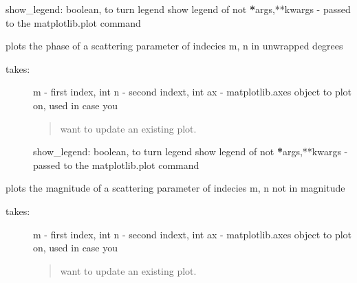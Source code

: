 \documentclass[letterpaper,10pt,english]{sphinxmanual}
\begin{document}
\begin{fulllineitems}
\begin{fulllineitems}
\begin{description}
show\_legend: boolean, to turn legend show legend of not
{\color{red}\bfseries{}*}args,**kwargs - passed to the matplotlib.plot command

\end{description}

\end{fulllineitems}


\begin{fulllineitems}
\label{api/mwavepy:mwavepy.network.Network.plot_s_deg_unwrapped}
plots the phase of a scattering parameter of indecies m, n in
unwrapped degrees
\begin{description}
\item[{takes:}] \leavevmode
m - first index, int
n - second indext, int
ax - matplotlib.axes object to plot on, used in case you
\begin{quote}

want to update an existing plot.
\end{quote}

show\_legend: boolean, to turn legend show legend of not
{\color{red}\bfseries{}*}args,**kwargs - passed to the matplotlib.plot command

\end{description}

\end{fulllineitems}


\begin{fulllineitems}
\label{api/mwavepy:mwavepy.network.Network.plot_s_mag}
plots the magnitude of a scattering parameter of indecies m, n
not in  magnitude
\begin{description}
\item[{takes:}] \leavevmode
m - first index, int
n - second indext, int
ax - matplotlib.axes object to plot on, used in case you
\begin{quote}

want to update an existing plot.
\end{quote}


\end{description}
\end{fulllineitems}
\end{fulllineitems}
\end{document}
